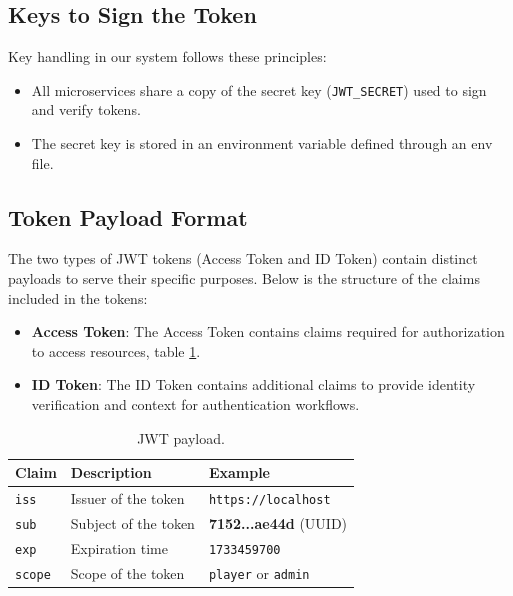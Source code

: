 \documentclass{article}
\begin{document}
\subsection{Keys to Sign the Token}
Key handling in our system follows these principles:
\begin{itemize}
    \item All microservices share a copy of the secret key (\texttt{JWT\_SECRET}) used to sign and verify tokens.
    \item The secret key is stored in an environment variable defined through an env file.
\end{itemize}

\newpage

\subsection{Token Payload Format} The two types of JWT tokens (Access Token and ID Token) contain distinct payloads to serve their specific purposes. Below is the structure of the claims included in the tokens:

\begin{itemize}
    \item \textbf{Access Token}: The Access Token contains claims required for authorization to access resources, table \ref{tab:jwt-payload}.
    \item \textbf{ID Token}: The ID Token contains additional claims to provide identity verification and context for authentication workflows.
\end{itemize}


\begin{table}[h!]
    \centering
    \begin{tabular}{@{}p{2cm}p{4cm}p{6cm}@{}}
        \toprule
        \textbf{Claim} & \textbf{Description} & \textbf{Example}                  \\ \midrule
        \texttt{iss}   & Issuer of the token  & \texttt{https://localhost}        \\
        \texttt{sub}   & Subject of the token & \textbf{7152...ae44d} (UUID)      \\
        \texttt{exp}   & Expiration time      & \texttt{1733459700}               \\
        \texttt{scope} & Scope of the token   & \texttt{player} or \texttt{admin} \\
    \end{tabular}
    \caption{JWT payload.}
    \label{tab:jwt-payload}
\end{table}
\newpage
\end{document}
